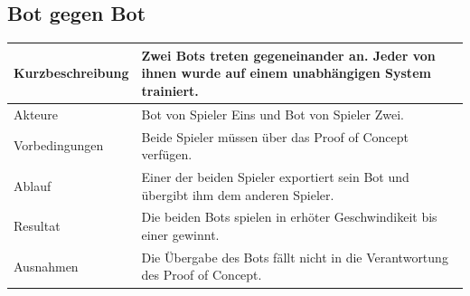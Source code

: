 \subsection{Bot gegen Bot}
\begin{tabularx}{\textwidth}{| X | X |}
	\hline
	Kurzbeschreibung & Zwei Bots treten gegeneinander an. Jeder von ihnen wurde auf einem unabhängigen System trainiert. \\
	\hline
	Akteure & Bot von Spieler Eins und Bot von Spieler Zwei. \\
	\hline
	Vorbedingungen & Beide Spieler müssen über das Proof of Concept verfügen. \\
	\hline
	Ablauf & Einer der beiden Spieler exportiert sein Bot und übergibt ihm dem anderen Spieler.\\
	\hline
	Resultat & Die beiden Bots spielen in erhöter Geschwindikeit bis einer gewinnt. \\
	\hline
	Ausnahmen & Die Übergabe des Bots fällt nicht in die Verantwortung des Proof of Concept.\\
	\hline
\end{tabularx}
\newpage
